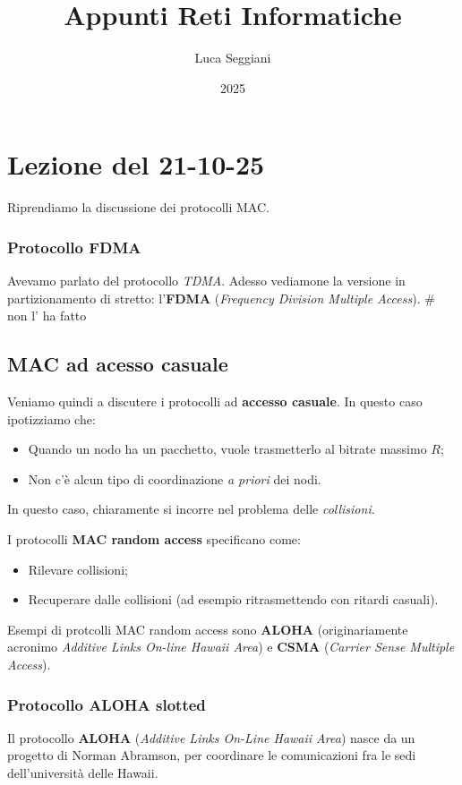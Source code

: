 \documentclass[a4paper,11pt]{article}
\title{Appunti Reti Informatiche}
\author{Luca Seggiani}
\date{2025}
\begin{document}
\section{Lezione del 21-10-25}

\thispagestyle{empty}
\pagestyle{fancy}

Riprendiamo la discussione dei protocolli MAC.

\subsubsection{Protocollo FDMA}
Avevamo parlato del protocollo \textit{TDMA}. Adesso vediamone la versione in partizionamento di stretto: l'\textbf{FDMA} (\textit{Frequency Division Multiple Access}).
# non l' ha fatto

\subsection{MAC ad acesso casuale}
Veniamo quindi a discutere i protocolli ad \textbf{accesso casuale}.
In questo caso ipotizziamo che:
\begin{itemize}
	\item Quando un nodo ha un pacchetto, vuole trasmetterlo al bitrate massimo $R$;
	\item Non c'è alcun tipo di coordinazione \textit{a priori} dei nodi.
\end{itemize}

In questo caso, chiaramente si incorre nel problema delle \textit{collisioni}.

I protocolli \textbf{MAC random access} specificano come:
\begin{itemize}
	\item Rilevare collisioni;
	\item Recuperare dalle collisioni (ad esempio ritrasmettendo con ritardi casuali).
\end{itemize}

Esempi di protcolli MAC random access sono \textbf{ALOHA} (originariamente acronimo \textit{Additive Links On-line Hawaii Area}) e \textbf{CSMA} (\textit{Carrier Sense Multiple Access}).

\subsubsection{Protocollo ALOHA slotted}
Il protocollo \textbf{ALOHA} (\textit{Additive Links On-Line Hawaii Area}) nasce da un progetto di Norman Abramson, per coordinare le comunicazioni fra le sedi dell'università delle Hawaii.
\end{document}
